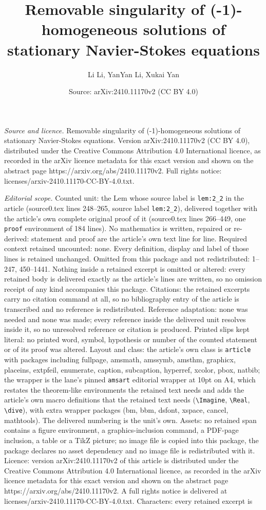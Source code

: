 \documentclass[10pt,a4paper]{amsart}
\title[Removable singularity of (-1)-homogeneous solutions of stati]{Removable singularity of (-1)-homogeneous solutions of stationary Navier-Stokes equations}
\author{Li Li, YanYan Li, Xukai Yan}
\date{Source: arXiv:2410.11170v2 (CC BY 4.0)}
\begin{document}
\maketitle

\noindent\emph{Source and licence.} Removable singularity of (-1)-homogeneous solutions of stationary Navier-Stokes equations. Version arXiv:2410.11170v2 (CC BY 4.0), distributed under the Creative Commons Attribution 4.0 International licence, as recorded in the arXiv licence metadata for this exact version and shown on the abstract page https://arxiv.org/abs/2410.11170v2. Full rights notice: licenses/arxiv-2410.11170-CC-BY-4.0.txt.\par\smallskip

\noindent\textit{Editorial scope.} Counted unit: the Lem whose source label is \texttt{lem:2\_2} in the article (source0.tex lines 248--265, source label \texttt{lem:2\_2}), delivered together with the article's own complete original proof of it (source0.tex lines 266--449, one \texttt{proof} environment of 184 lines). No mathematics is written, repaired or re-derived: statement and proof are the article's own text line for line. Required context retained uncounted: none. Every definition, display and label of those lines is retained unchanged. Omitted from this package and not redistributed: 1--247, 450--1441. Nothing inside a retained excerpt is omitted or altered: every retained body is delivered exactly as the article's lines are written, so no omission receipt of any kind accompanies this package. Citations: the retained excerpts carry no citation command at all, so no bibliography entry of the article is transcribed and no reference is redistributed. Reference adaptation: none was needed and none was made; every reference inside the delivered unit resolves inside it, so no unresolved reference or citation is produced. Printed slips kept literal: no printed word, symbol, hypothesis or number of the counted statement or of its proof was altered. Layout and class: the article's own class is \texttt{article} with packages including fullpage, amsmath, amssymb, amsthm, graphicx, placeins, extpfeil, enumerate, caption, subcaption, hyperref, xcolor, pbox, natbib; the wrapper is the lane's pinned \texttt{amsart} editorial wrapper at 10pt on A4, which restates the theorem-like environments the retained text needs and adds the article's own macro definitions that the retained text needs (\texttt{\textbackslash Imagine}, \texttt{\textbackslash Real}, \texttt{\textbackslash dive}), with extra wrapper packages (bm, bbm, dsfont, xspace, cancel, mathtools). The delivered numbering is the unit's own. Assets: no retained span contains a figure environment, a graphics-inclusion command, a PDF-page inclusion, a table or a TikZ picture; no image file is copied into this package, the package declares no asset dependency and no image file is redistributed with it. Licence: version arXiv:2410.11170v2 of this article is distributed under the Creative Commons Attribution 4.0 International licence, as recorded in the arXiv licence metadata for this exact version and shown on the abstract page https://arxiv.org/abs/2410.11170v2. A full rights notice is delivered at licenses/arxiv-2410.11170-CC-BY-4.0.txt. Characters: every retained excerpt is 
\end{document}
